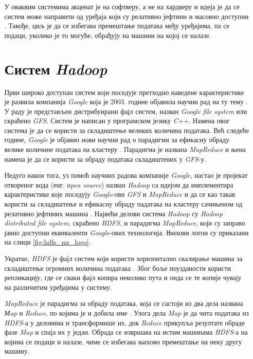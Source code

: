 \documentclass[12pt,oneside]{memoir}
\begin{document}
У оваквим системима акценат је на софтверу, а не на хардверу и идеја је да се систем може направити од уређаја који су релативно јефтини и масовно доступни \cite{hadoop_beginner}. Такође, циљ је да се избегава премештање података међу уређајима, па се подаци, уколико је то могуће, обрађују на машини на којој се налазе.

\section{Систем \textit{Hadoop}}
\label{sec:hadoop}

Први широко доступан систем који поседује претходно наведене карактеристике је развила компанија \textit{Google} која је 2003. године објавила научни рад на ту тему \cite{gfs}. У раду је представљен дистрибуирани фајл систем, назван \textit{Google file system} или скраћено \textit{GFS}. Систем је написан у програмском језику \textit{C++}. Намена овог система је да се користи за складиштење великих количина података. Већ следеће године, \textit{Google} је објавио нови научни рад о парадигми за ефикасну обраду велике количине података на кластеру \cite{gmr}. Парадигма је названа \textit{MapReduce} и њена намена је да се користи за обраду података складиштених у \textit{GFS}-у.

Недуго након тога, уз помоћ научних радова компаније \textit{Google}, настао је пројекат отвореног кода (енг. \textit{оpen source}) назван \textit{Hadoop} са идејом да имплементира карактеристике које поседују \textit{Google}-ови \textit{GFS} и \textit{MapReduce} и да се као такав користи за складиштење и ефикасну обраду падатака на кластеру сачињеном од релативно јефтиних машина \cite{hadoop_beginner}. Највећи делови система \textit{Hadoop} су \textit{Hadoop distributed file system}, скраћено \textit{HDFS}, и парадигма \textit{MapReduce}, који су заправо јавно доступни еквиваленти \textit{Google}-ових технологија. Њихови логои су приказани на слици \ref{fig:hdfs_mr_logo}.

Укратко, \textit{HDFS} је фајл систем који користи хоризонтално скалирање машина за складиштење огромних количина података \cite{hadoop_beginner}. Због боље поузданости користи репликацију, где се сваки фајл копира неколико пута и онда се те копије чувају на различитим уређајима у систему.

\textit{MapReduce} је парадигма за обраду података, која се састоји из два дела названа \textit{Мap} и \textit{Reduce}, по којима је и добила име \cite{hadoop_beginner}. Улога дела \textit{Map} је да чита података из \textit{HDFS}-а у деловима и трансформише их, док \textit{Reduce} прикупља резултате обраде фазе \textit{Map} и спаја их у један. Обрада се извршава на истим машинама \textit{HDFS}-а на којима се подаци и налазе, чиме се избегава њихово премештање на неку другу машину.
\end{document}
